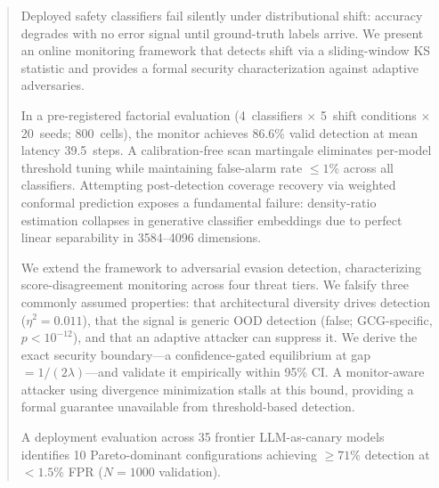 \begin{abstract}
Deployed safety classifiers fail silently under distributional shift: accuracy degrades with no error signal until ground-truth labels arrive. We present an online monitoring framework that detects shift via a sliding-window KS statistic and provides a formal security characterization against adaptive adversaries.

In a pre-registered factorial evaluation (4~classifiers $\times$ 5~shift conditions $\times$ 20~seeds; 800~cells), the monitor achieves 86.6\% valid detection at mean latency 39.5~steps. A calibration-free scan martingale eliminates per-model threshold tuning while maintaining false-alarm rate $\leq 1\%$ across all classifiers. Attempting post-detection coverage recovery via weighted conformal prediction exposes a fundamental failure: density-ratio estimation collapses in generative classifier embeddings due to perfect linear separability in 3584–4096 dimensions.

We extend the framework to adversarial evasion detection, characterizing score-disagreement monitoring across four threat tiers. We falsify three commonly assumed properties: that architectural diversity drives detection ($\eta^2 = 0.011$), that the signal is generic OOD detection (false; GCG-specific, $p < 10^{-12}$), and that an adaptive attacker can suppress it. We derive the exact security boundary—a confidence-gated equilibrium at gap $= 1/(2\lambda)$—and validate it empirically within 95\% CI. A monitor-aware attacker using divergence minimization stalls at this bound, providing a formal guarantee unavailable from threshold-based detection.

A deployment evaluation across 35 frontier LLM-as-canary models identifies 10 Pareto-dominant configurations achieving $\geq 71\%$ detection at $< 1.5\%$ FPR ($N{=}1000$ validation).
\end{abstract}


%
%
%
%

